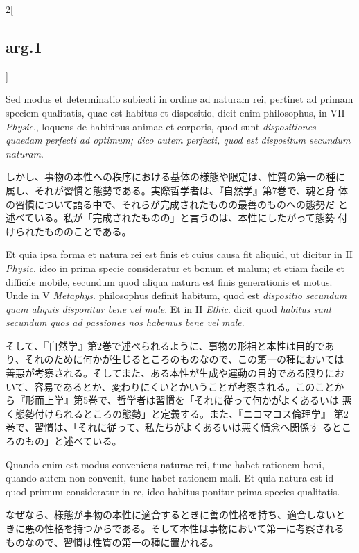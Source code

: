 \documentclass[paper=a4paper,fontsize=10pt,jafontsize=9pt,titlepage]{jlreq}
\begin{document}
\begin{paracol}{2}[\subsection{arg.1}]
\switchcolumn*

Sed modus et determinatio subiecti in ordine ad naturam rei, pertinet
ad primam speciem qualitatis, quae est habitus et dispositio, dicit
enim philosophus, in VII {\itshape Physic}., loquens de habitibus animae et
corporis, quod sunt {\itshape dispositiones quaedam perfecti ad optimum; dico
autem perfecti, quod est dispositum secundum naturam}.

\switchcolumn

しかし、事物の本性への秩序における基体の様態や限定は、性質の第一の種に
属し、それが習慣と態勢である。実際哲学者は、『自然学』第7巻で、魂と身
体の習慣について語る中で、それらが完成されたものの最善のものへの態勢だ
と述べている。私が「完成されたものの」と言うのは、本性にしたがって態勢
付けられたもののことである。

\switchcolumn*

Et quia ipsa forma et
natura rei est finis et cuius causa fit aliquid, ut dicitur in II
{\itshape Physic}. ideo in prima specie consideratur et bonum et malum; et etiam
facile et difficile mobile, secundum quod aliqua natura est finis
generationis et motus. Unde in V {\itshape Metaphys}. philosophus definit
habitum, quod est {\itshape dispositio secundum quam aliquis disponitur bene vel
male}. Et in II {\itshape Ethic}. dicit quod {\itshape habitus sunt secundum quos ad
passiones nos habemus bene vel male}.

\switchcolumn

そして、『自然学』第2巻で述べられるように、事物の形相と本性は目的であ
り、それのために何かが生じるところのものなので、この第一の種においては
善悪が考察される。そしてまた、ある本性が生成や運動の目的である限りにお
いて、容易であるとか、変わりにくいとかいうことが考察される。このことか
ら『形而上学』第5巻で、哲学者は習慣を「それに従って何かがよくあるいは
悪く態勢付けられるところの態勢」と定義する。また、『ニコマコス倫理学』
第2巻で、習慣は、「それに従って、私たちがよくあるいは悪く情念へ関係す
るところのもの」と述べている。

\switchcolumn*

Quando enim est modus conveniens
naturae rei, tunc habet rationem boni, quando autem non convenit, tunc
habet rationem mali. Et quia natura est id quod primum consideratur in
re, ideo habitus ponitur prima species qualitatis.

\switchcolumn

なぜなら、様態が事物の本性に適合するときに善の性格を持ち、適合しないと
きに悪の性格を持つからである。そして本性は事物において第一に考察される
ものなので、習慣は性質の第一の種に置かれる。


\end{paracol}
\end{document}
